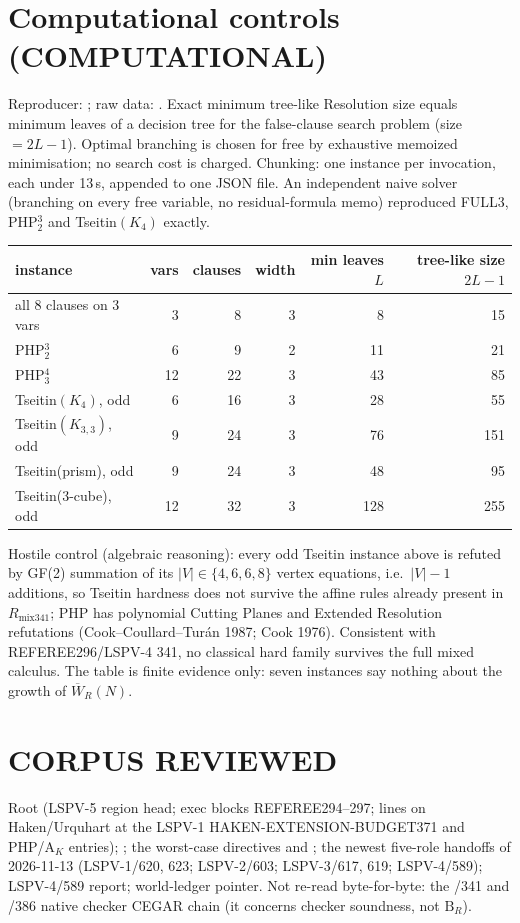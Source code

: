 \documentclass[11pt]{article}
\begin{document}
\section{Computational controls (COMPUTATIONAL)}
Reproducer: ;
raw data: .
Exact minimum tree-like Resolution size equals minimum leaves of a decision tree for
the false-clause search problem (size $=2L-1$).  Optimal branching is chosen for free by
exhaustive memoized minimisation; no search cost is charged.  Chunking: one instance per
invocation, each under 13\,s, appended to one JSON file.  An independent naive solver
(branching on every free variable, no residual-formula memo) reproduced FULL3, PHP$^3_2$ and
Tseitin$(K_4)$ exactly.
\begin{center}
\begin{tabular}{lrrrrr}
instance & vars & clauses & width & min leaves $L$ & tree-like size $2L-1$\\\hline
all 8 clauses on 3 vars & 3 & 8 & 3 & 8 & 15\\
PHP$^3_2$ & 6 & 9 & 2 & 11 & 21\\
PHP$^4_3$ & 12 & 22 & 3 & 43 & 85\\
Tseitin$(K_4)$, odd & 6 & 16 & 3 & 28 & 55\\
Tseitin$(K_{3,3})$, odd & 9 & 24 & 3 & 76 & 151\\
Tseitin(prism), odd & 9 & 24 & 3 & 48 & 95\\
Tseitin(3-cube), odd & 12 & 32 & 3 & 128 & 255\\
\end{tabular}
\end{center}
Hostile control (algebraic reasoning): every odd Tseitin instance above is refuted by GF(2)
summation of its $|V|\in\{4,6,6,8\}$ vertex equations, i.e.\ $|V|-1$ additions, so
Tseitin hardness does not survive the affine rules already present in $R_{\mathrm{mix341}}$;
PHP has polynomial Cutting Planes and Extended Resolution refutations
(Cook--Coullard--Turán 1987; Cook 1976).  Consistent with REFEREE296/LSPV-4 341, no
classical hard family survives the full mixed calculus.  The table is finite evidence only:
seven instances say nothing about the growth of $\overline W_R(N)$.

\section*{CORPUS REVIEWED}
Root  (LSPV-5 region head; exec blocks REFEREE294--297; lines on Haken/Urquhart
at the LSPV-1 HAKEN-EXTENSION-BUDGET371 and PHP/A$_K$ entries); ; the
worst-case directives
and ;
the newest five-role handoffs of 2026-11-13 (LSPV-1/620, 623; LSPV-2/603; LSPV-3/617, 619;
LSPV-4/589); LSPV-4/589 report; world-ledger pointer.  Not re-read byte-for-byte: the
/341 and /386 native checker CEGAR chain (it concerns checker soundness, not $\mathrm B_R$).
\end{document}
